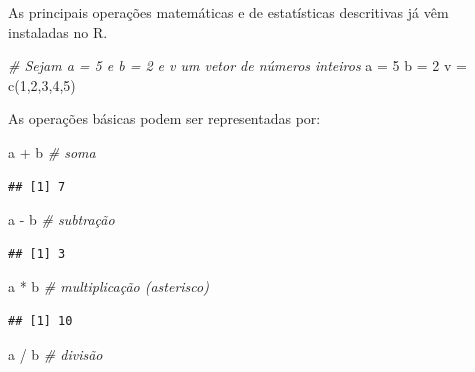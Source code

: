 \documentclass[
]{book}
\newenvironment{Shaded}{\begin{snugshade}}{\end{snugshade}}
\newcommand{\CommentTok}[1]{\textcolor[rgb]{0.56,0.35,0.01}{\textit{#1}}}
\newcommand{\DecValTok}[1]{\textcolor[rgb]{0.00,0.00,0.81}{#1}}
\newcommand{\FunctionTok}[1]{\textcolor[rgb]{0.00,0.00,0.00}{#1}}
\newcommand{\NormalTok}[1]{#1}
\newcommand{\OtherTok}[1]{\textcolor[rgb]{0.56,0.35,0.01}{#1}}
\newcommand{\SpecialCharTok}[1]{\textcolor[rgb]{0.00,0.00,0.00}{#1}}
\begin{document}
As principais operações matemáticas e de estatísticas descritivas já vêm instaladas no R.

\begin{Shaded}
\begin{Highlighting}[]
\CommentTok{\# Sejam a = 5 e b = 2 e v um vetor de números inteiros}
\NormalTok{a }\OtherTok{=} \DecValTok{5}
\NormalTok{b }\OtherTok{=} \DecValTok{2}
\NormalTok{v }\OtherTok{=} \FunctionTok{c}\NormalTok{(}\DecValTok{1}\NormalTok{,}\DecValTok{2}\NormalTok{,}\DecValTok{3}\NormalTok{,}\DecValTok{4}\NormalTok{,}\DecValTok{5}\NormalTok{)}
\end{Highlighting}
\end{Shaded}

As operações básicas podem ser representadas por:

\begin{Shaded}
\begin{Highlighting}[]
\NormalTok{a }\SpecialCharTok{+}\NormalTok{ b }\CommentTok{\# soma}
\end{Highlighting}
\end{Shaded}

\begin{verbatim}
## [1] 7
\end{verbatim}

\begin{Shaded}
\begin{Highlighting}[]
\NormalTok{a }\SpecialCharTok{{-}}\NormalTok{ b }\CommentTok{\# subtração}
\end{Highlighting}
\end{Shaded}

\begin{verbatim}
## [1] 3
\end{verbatim}

\begin{Shaded}
\begin{Highlighting}[]
\NormalTok{a }\SpecialCharTok{*}\NormalTok{ b }\CommentTok{\# multiplicação (asterisco)}
\end{Highlighting}
\end{Shaded}

\begin{verbatim}
## [1] 10
\end{verbatim}

\begin{Shaded}
\begin{Highlighting}[]
\NormalTok{a }\SpecialCharTok{/}\NormalTok{ b }\CommentTok{\# divisão}
\end{Highlighting}
\end{Shaded}
\end{document}
